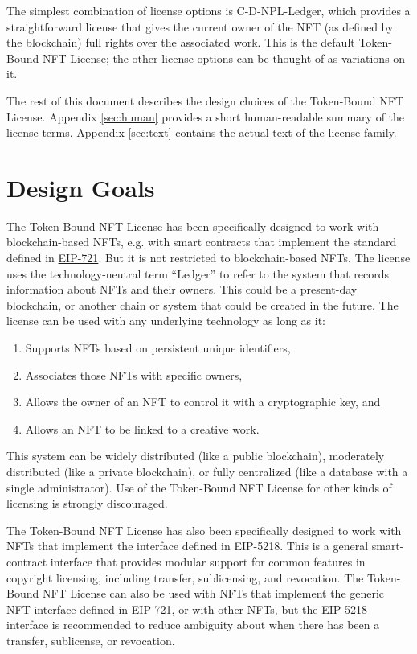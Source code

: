 \documentclass{article}
\newcommand{\eiplicense}{EIP-5218\xspace}
\newcommand{\iccclicense}{Token-Bound NFT License\xspace}
\begin{document}
The simplest combination of license options is C-D-NPL-Ledger, which provides a straightforward license that gives the current owner of the NFT (as defined by the blockchain) full rights over the associated work. This is the default \iccclicense; the other license options can be thought of as variations on it.

The rest of this document describes the design choices of the \iccclicense. Appendix \ref{sec:human} provides a short human-readable summary of the license terms. Appendix \ref{sec:text} contains the actual text of the license family.


\section{Design Goals}


The \iccclicense has been specifically designed to work with blockchain-based NFTs, e.g. with smart contracts that implement the standard defined in \href{https://eips.ethereum.org/EIPS/eip-721}{EIP-721}. But it is not restricted to blockchain-based NFTs. The license uses the technology-neutral term ``Ledger'' to refer to the system that records information about NFTs and their owners. This could be a present-day blockchain, or another chain or system that could be created in the future. The license can be used with any underlying technology as long as it:
\begin{enumerate}
\item Supports NFTs based on persistent unique identifiers, 
\item Associates those NFTs with specific owners,
\item Allows the owner of an NFT to control it with a cryptographic key, and 
\item Allows an NFT to be linked to a creative work. 
\end{enumerate}
This system can be widely distributed (like a public blockchain), moderately distributed (like a private blockchain), or fully centralized (like a database with a single administrator). Use of the \iccclicense for other kinds of licensing is strongly discouraged.

The \iccclicense has also been specifically designed to work with NFTs that implement the interface defined in \eiplicense. This is a general smart-contract interface that provides modular support for common features in copyright licensing, including transfer, sublicensing, and revocation. The \iccclicense can also be used with NFTs that implement the generic NFT interface defined in EIP-721, or with other NFTs, but the \eiplicense interface is recommended to reduce ambiguity about when there has been a transfer, sublicense, or revocation.
\end{document}
